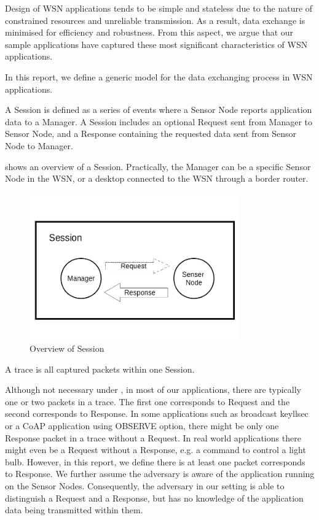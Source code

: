 Design of WSN applications tends to be simple and stateless due to the nature of constrained resources and unreliable transmission. As a result, data exchange is minimised for efficiency and robustness. From this aspect, we argue that our sample applications have captured these most significant characteristics of WSN applications.

In this report, we define a generic model for the data exchanging process in WSN applications.

\begin{definition} \label{Def: Session}
A Session is defined as a series of events where a Sensor Node reports application data to a Manager. A Session includes an optional Request sent from Manager to Sensor Node, and a Response containing the requested data sent from Sensor Node to Manager.
\end{definition}

 shows an overview of a Session. Practically, the Manager can be a specific Sensor Node in the WSN, or a desktop connected to the WSN through a border router.

\begin{figure}[th!]
	\center
	\includegraphics[width=0.8\textwidth]{fig/Session.png}
	\caption{Overview of Session}
	\label{Fig: Overview of Session}
\end{figure}

\begin{definition} \label{Def: Trace}
A trace is all captured packets within one Session.
\end{definition}

Although not necessary under , in most of our applications, there are typically one or two packets in a trace. The first one corresponds to Request and the second corresponds to Response. In some applications such as broadcast keyllsec or a CoAP application using OBSERVE option, there might be only one Response packet in a trace without a Request. In real world applications there might even be a Request without a Response, e.g. a command to control a light bulb. However, in this report, we define there is at least one packet corresponds to Response. We further assume the adversary is aware of the application running on the Sensor Nodes. Consequently, the adversary in our setting is able to distinguish a Request and a Response, but has no knowledge of the application data being transmitted within them.

